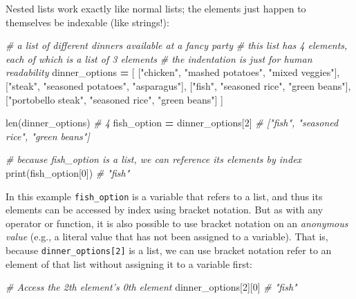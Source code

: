 \documentclass[]{book}
\newenvironment{Shaded}{\begin{snugshade}}{\end{snugshade}}
\newcommand{\DecValTok}[1]{\textcolor[rgb]{0.00,0.00,0.81}{#1}}
\newcommand{\StringTok}[1]{\textcolor[rgb]{0.31,0.60,0.02}{#1}}
\newcommand{\CommentTok}[1]{\textcolor[rgb]{0.56,0.35,0.01}{\textit{#1}}}
\newcommand{\OperatorTok}[1]{\textcolor[rgb]{0.81,0.36,0.00}{\textbf{#1}}}
\newcommand{\BuiltInTok}[1]{#1}
\newcommand{\NormalTok}[1]{#1}
\begin{document}
Nested lists work exactly like normal lists; the elements just happen to
themselves be indexable (like strings!):

\begin{Shaded}
\begin{Highlighting}[]
\CommentTok{# a list of different dinners available at a fancy party}
\CommentTok{# this list has 4 elements, each of which is a list of 3 elements}
\CommentTok{# the indentation is just for human readability}
\NormalTok{dinner_options }\OperatorTok{=}\NormalTok{ [}
\NormalTok{    [}\StringTok{"chicken"}\NormalTok{, }\StringTok{"mashed potatoes"}\NormalTok{, }\StringTok{"mixed veggies"}\NormalTok{],}
\NormalTok{    [}\StringTok{"steak"}\NormalTok{, }\StringTok{"seasoned potatoes"}\NormalTok{, }\StringTok{"asparagus"}\NormalTok{],}
\NormalTok{    [}\StringTok{"fish"}\NormalTok{, }\StringTok{"seasoned rice"}\NormalTok{, }\StringTok{"green beans"}\NormalTok{],}
\NormalTok{    [}\StringTok{"portobello steak"}\NormalTok{, }\StringTok{"seasoned rice"}\NormalTok{, }\StringTok{"green beans"}\NormalTok{]}
\NormalTok{]}

\BuiltInTok{len}\NormalTok{(dinner_options)   }\CommentTok{# 4}
\NormalTok{fish_option }\OperatorTok{=}\NormalTok{ dinner_options[}\DecValTok{2}\NormalTok{]  }\CommentTok{# ["fish", "seasoned rice", "green beans"]}

\CommentTok{# because fish_option is a list, we can reference its elements by index}
\BuiltInTok{print}\NormalTok{(fish_option[}\DecValTok{0}\NormalTok{])  }\CommentTok{# "fish"}
\end{Highlighting}
\end{Shaded}

In this example \texttt{fish\_option} is a variable that refers to a
list, and thus its elements can be accessed by index using bracket
notation. But as with any operator or function, it is also possible to
use bracket notation on an \emph{anonymous value} (e.g., a literal value
that has not been assigned to a variable). That is, because
\texttt{dinner\_options{[}2{]}} is a list, we can use bracket notation
refer to an element of that list without assigning it to a variable
first:

\begin{Shaded}
\begin{Highlighting}[]
\CommentTok{# Access the 2th element's 0th element}
\NormalTok{dinner_options[}\DecValTok{2}\NormalTok{][}\DecValTok{0}\NormalTok{]  }\CommentTok{# "fish"}
\end{Highlighting}
\end{Shaded}
\end{document}
